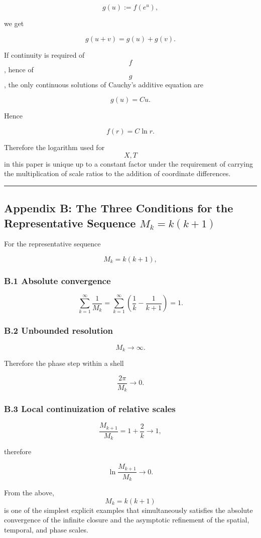 \documentclass[
  a4paper,
]{article}
\begin{document}
\[
g(u):=f(e^u),
\]

we get

\[
g(u+v)=g(u)+g(v).
\tag{A2}
\]

If continuity is required of \[f\], hence of \[g\], the only continuous
solutions of Cauchy's additive equation are

\[
g(u)=Cu.
\]

Hence

\[
\boxed{
f(r)=C\ln r.
}
\tag{A3}
\]

Therefore the logarithm used for \[X,T\] in this paper is unique up to a
constant factor under the requirement of carrying the multiplication of
scale ratios to the addition of coordinate differences.

\begin{center}\rule{0.5\linewidth}{0.5pt}\end{center}

\subsection{\texorpdfstring{Appendix B: The Three Conditions for the
Representative Sequence
\(M_k=k(k+1)\)}{Appendix B: The Three Conditions for the Representative Sequence M\_k=k(k+1)}}\label{appendix-b-the-three-conditions-for-the-representative-sequence-m_kkk1}

For the representative sequence

\[
M_k=k(k+1),
\]

\subsubsection{B.1 Absolute convergence}\label{b.1-absolute-convergence}

\[
\sum_{k=1}^{\infty}\frac{1}{M_k}
=
\sum_{k=1}^{\infty}
\left(\frac1k-\frac1{k+1}\right)
=1.
\]

\subsubsection{B.2 Unbounded resolution}\label{b.2-unbounded-resolution}

\[
M_k\to\infty.
\]

Therefore the phase step within a shell

\[
\frac{2\pi}{M_k}\to0.
\]

\subsubsection{B.3 Local continuization of relative
scales}\label{b.3-local-continuization-of-relative-scales}

\[
\frac{M_{k+1}}{M_k}
=1+\frac{2}{k}
\to1,
\]

therefore

\[
\ln\frac{M_{k+1}}{M_k}
\to0.
\]

From the above, \[M_k=k(k+1)\] is one of the simplest explicit examples
that simultaneously satisfies the absolute convergence of the infinite
closure and the asymptotic refinement of the spatial, temporal, and
phase scales.
\end{document}
